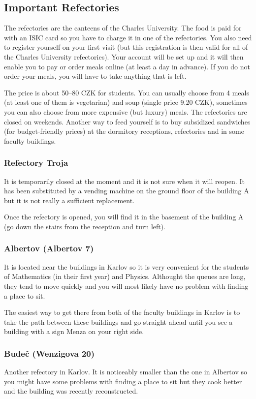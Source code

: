\subsection{Important Refectories}
The refectories are the canteens of the Charles University. The food is paid for
with an ISIC card so you have to charge it in one of the refectories. You also
need to register yourself on your first visit (but this registration is then
valid for all of the Charles University refectories).
Your account will be set up and it will then enable you to pay or order meals
online (at least a day in advance). If you do not order your meals, you will
have to take anything that is left.

The price is about 50--80 CZK for students. You can usually choose from 4 meals
(at least one of them is vegetarian) and soup (single price 9.20 CZK), sometimes
you can also choose from more expensive (but luxury) meals.
The refectories are closed on weekends. Another way to feed yourself is to buy
subsidized sandwiches (for budget-friendly prices) at the dormitory receptions,
refectories and in some faculty buildings.


\subsubsection{Refectory Troja}
It is temporarily closed at the moment and it is not sure when it will reopen.
It has been substituted by a vending machine on the ground floor of the building
A but it is not really a sufficient replacement.

Once the refectory is opened, you will find it in the basement of the building A
(go down the stairs from the reception and turn left).


\subsubsection{Albertov (Albertov 7)}
It is located near the buildings in Karlov so it is very convenient for the
students of Mathematics (in their first year) and Physics. Althought the queues
are long, they tend to move quickly and you will most likely have no problem
with finding a place to sit.

The easiest way to get there from both of the faculty buildings in Karlov is to
take the path between these buildings and go straight ahead until you see a
building with a sign Menza on your right side.


\subsubsection{Budeč (Wenzigova 20)}
Another refectory in Karlov. It is noticeably smaller than the one in Albertov
so you might have some problems with finding a place to sit but they cook better
and the building was recently reconstructed.

